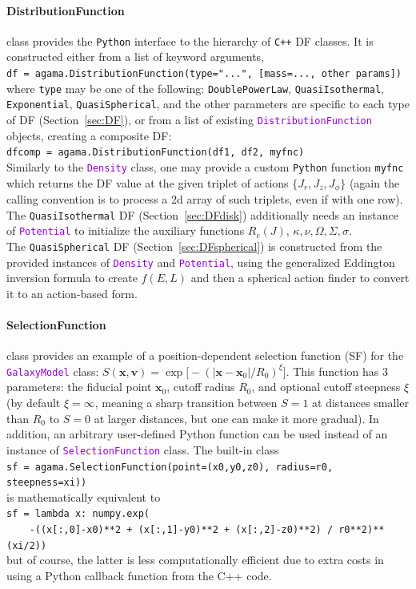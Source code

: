 \documentclass[12pt]{article}
\newcommand{\Cpp}  {\texttt{C++}\xspace}
\newcommand{\Python}{\texttt{Python}\xspace}
\newcommand{\ttt}[1]{\textcolor{darkviolet}{\texttt{#1}}}
\newcommand{\ppp}[1]{\textcolor{darkolive} {\texttt{#1}}}
\newcommand{\bv}{\boldsymbol{v}}
\newcommand{\bx}{\boldsymbol{x}}
\begin{document}
\paragraph{DistributionFunction} class provides the \Python interface to the hierarchy of \Cpp DF classes. It is constructed either from a list of keyword arguments,\\[1mm]
\texttt{df = agama.DistributionFunction(type="...", [mass=..., other params])}\\[1mm]
where \ppp{type} may be one of the following: \ppp{DoublePowerLaw}, \ppp{QuasiIsothermal}, \ppp{Exponential}, \ppp{QuasiSpherical}, and the other parameters are specific to each type of DF (Section~\ref{sec:DF}),
or from a list of existing \ttt{DistributionFunction} objects, creating a composite DF:\\[1mm]
\texttt{dfcomp = agama.DistributionFunction(df1, df2, myfnc)}
\\[2mm]
Similarly to the \ttt{Density} class, one may provide a custom \Python function \texttt{myfnc} which returns the DF value at the given triplet of actions $\{J_r,J_z,J_\phi\}$ (again the calling convention is to process a 2d array of such triplets, even if with one row).
\\[2mm]
The \ppp{QuasiIsothermal} DF (Section~\ref{sec:DFdisk}) additionally needs an instance of \ttt{Potential} to initialize the auxiliary functions $R_c(J)$, $\kappa,\nu,\Omega,\Sigma,\sigma$.
\\[2mm]
The \ppp{QuasiSpherical} DF (Section~\ref{sec:DFspherical}) is constructed from the provided instances of \ttt{Density} and \ttt{Potential}, using the generalized Eddington inversion formula to create $f(E,L)$ and then a spherical action finder to convert it to an action-based form.

\paragraph{SelectionFunction} class provides an example of a position-dependent selection function (SF) for the \ttt{GalaxyModel} class: $S(\bx, \bv) = \exp\big[-(|\bx-\bx_0|/R_0)^\xi\big]$. This function has 3 parameters: the fiducial point $\bx_0$, cutoff radius $R_0$, and optional cutoff steepness $\xi$ (by default $\xi=\infty$, meaning a sharp transition between $S=1$ at distances smaller than $R_0$ to $S=0$ at larger distances, but one can make it more gradual). In addition, an arbitrary user-defined Python function can be used instead of an instance of \ttt{SelectionFunction} class. The built-in class\\
\texttt{sf = agama.SelectionFunction(point=(x0,y0,z0), radius=r0, steepness=xi))}\\
is mathematically equivalent to\\
\texttt{sf = lambda x: numpy.exp( \\
\mbox{}~~~~-((x[:,0]-x0)**2 + (x[:,1]-y0)**2 + (x[:,2]-z0)**2) / r0**2)**(xi/2))}\\
but of course, the latter is less computationally efficient due to extra costs in using a Python callback function from the C++ code.
\end{document}
